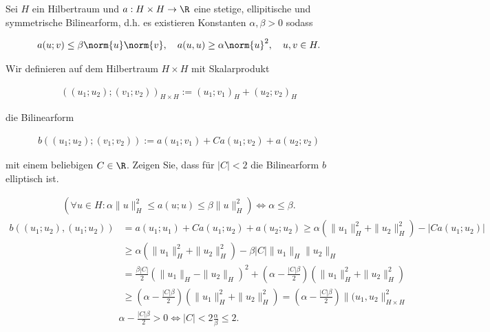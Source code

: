 
\begin{exercise}
Sei $H$ ein Hilbertraum und $a: H \times H \rightarrow \R$ eine stetige,
ellipitische und symmetrische Bilinearform, d.h. es existieren Konstanten
$\alpha, \beta > 0$ sodass

\begin{align*}
  a(u;v)
  \leq
  \beta \norm{u}\norm{v},
  \quad
  a(u,u) \geq \alpha \norm{u}^2,
  \quad
  u,v \in H.
\end{align*}

Wir definieren auf dem Hilbertraum $H \times H$ mit Skalarprodukt

\begin{align*}
  ((u_1;u_2);(v_1;v_2))_{H \times H} := (u_1;v_1)_H + (u_2;v_2)_H
\end{align*}

die Bilinearform

\begin{align*}
  b((u_1;u_2);(v_1;v_2)) := a(u_1;v_1) + Ca(u_1;v_2) + a(u_2;v_2)
\end{align*}

mit einem beliebigen $C \in \R$. Zeigen Sie, dass für $|C| < 2$ die Bilinearform $b$
elliptisch ist.
\end{exercise}


\begin{solution}
\begin{align*}
  (\forall u \in H: \alpha \|u\|_H^2 \leq a(u;u) \leq \beta\|u\|_H^2 )\iff \alpha \leq \beta.
\end{align*}
\begin{align*}
  b((u_1;u_2),(u_1;u_2)) &= a(u_1;u_1) + Ca(u_1;u_2) + a(u_2;u_2)
  \geq \alpha\left(\|u_1\|_H^2 + \|u_2\|_H^2\right) - |Ca(u_1;u_2)| \\
  &\geq \alpha\left(\|u_1\|_H^2 + \|u_2\|_H^2\right) - \beta|C|\|u_1\|_H\|u_2\|_H \\
  &= \frac{\beta|C|}{2}\left(\|u_1\|_H - \|u_2\|_H\right)^2 + \left(\alpha - \frac{|C|\beta}{2}\right)(\|u_1\|_H^2 + \|u_2\|_H^2) \\
  &\geq \left(\alpha - \frac{|C|\beta}{2}\right)(\|u_1\|_H^2 + \|u_2\|_H^2)
  = \left(\alpha - \frac{|C|\beta}{2}\right)\|(u_1,u_2\|_{H\times H}^2
\end{align*}
\begin{align*}
  \alpha - \frac{|C|\beta}{2} > 0 \iff |C| < 2\frac{\alpha}{\beta} \leq 2.
\end{align*}

\end{solution}

